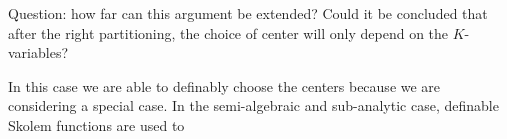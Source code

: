 {\color{blue} Question: how far can this argument be extended? Could it be concluded that after the right partitioning, the choice of center will only depend on the $K$-variables?}

In this case we are able to definably choose the centers because we are considering a special case. In the semi-algebraic and sub-analytic case, definable Skolem functions are used to  




